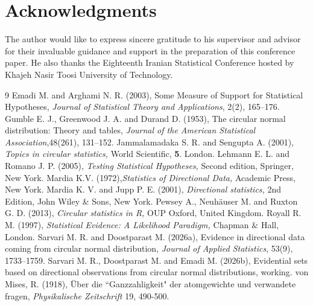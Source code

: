 \documentclass[twoside]{article}
\begin{document}
\section*{Acknowledgments}   
The author would like to express sincere gratitude to his supervisor and advisor for their invaluable guidance and support in the preparation of this conference paper. He also thanks the Eighteenth Iranian Statistical Conference hosted by Khajeh Nasir Toosi University of Technology.
\begin{thebibliography}{9}
Emadi M. and Arghami N. R. (2003), Some Measure of Support for Statistical Hypotheses, {\it Journal of Statistical Theory and Applications}, 2(2), 165--176.
Gumble E. J., Greenwood J. A. and Durand D. (1953), The circular normal distribution: Theory and tables, {\it Journal of the American Statistical Association},48(261), 131--152.
Jammalamadaka S. R. and Sengupta A. (2001), {\it Topics in circular statistics,} World Scientific, \textbf{5}. London.
Lehmann E. L. and Romano J. P. (2005), {\it Testing Statistical Hypotheses,} Second edition, Springer, New York.
Mardia K.V. (1972),{\it Statistics of Directional Data,} Academic Press, New York.
Mardia K. V. and Jupp P. E. (2001), {\it Directional statistics,} 2nd Edition, John Wiley \& Sons, New York.
Pewsey A., Neuhäuser M. and Ruxton G. D. (2013), {\it Circular statistics in R,} OUP Oxford, United Kingdom.
Royall R. M. (1997), {\it Statistical Evidence: A Likelihood Paradigm,} Chapman $\&$ Hall, London.
Sarvari M. R. and Doostparast M. (2026a), Evidence in directional data coming from circular normal distribution, {\it Journal of Applied Statistics}, 53(9), 1733--1759.
Sarvari M. R., Doostparast M. and Emadi M. (2026b), Evidential sets based on directional observations from circular normal
distributions, working.
von Mises, R. (1918), Über die “Ganzzahligkeit" der atomgewichte und verwandete fragen, {\it Physikalische Zeitschrift} 19, 490-500.
\end{thebibliography}
 
\end{document}

